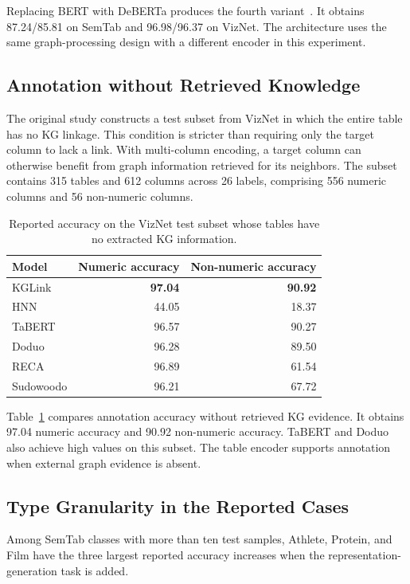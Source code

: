Replacing BERT with DeBERTa produces the fourth variant~\cite{kglink-he2020deberta}. It obtains 87.24/85.81 on SemTab and 96.98/96.37 on VizNet. The architecture uses the same graph-processing design with a different encoder in this experiment.

\subsection{Annotation without Retrieved Knowledge}
\label{sec:kglink:no-kg}

The original study constructs a test subset from VizNet in which the entire table has no KG linkage. This condition is stricter than requiring only the target column to lack a link. With multi-column encoding, a target column can otherwise benefit from graph information retrieved for its neighbors. The subset contains 315 tables and 612 columns across 26 labels, comprising 556 numeric columns and 56 non-numeric columns.

\begin{table}[tbp]
\centering
\caption{Reported accuracy on the VizNet test subset whose tables have no extracted KG information.}
\label{tab:kglink:no-kg}
\begin{tabular}{lrr}
\toprule
Model&Numeric accuracy&Non-numeric accuracy\\
\midrule
KGLink&\textbf{97.04}&\textbf{90.92}\\
HNN&44.05&18.37\\
TaBERT&96.57&90.27\\
Doduo&96.28&89.50\\
RECA&96.89&61.54\\
Sudowoodo&96.21&67.72\\
\bottomrule
\end{tabular}
\end{table}

Table~\ref{tab:kglink:no-kg} compares annotation accuracy without retrieved KG evidence. It obtains 97.04 numeric accuracy and 90.92 non-numeric accuracy. TaBERT and Doduo also achieve high values on this subset. The table encoder supports annotation when external graph evidence is absent.

\subsection{Type Granularity in the Reported Cases}
\label{sec:kglink:qualitative}

Among SemTab classes with more than ten test samples, Athlete, Protein, and Film have the three largest reported accuracy increases when the representation-generation task is added.


